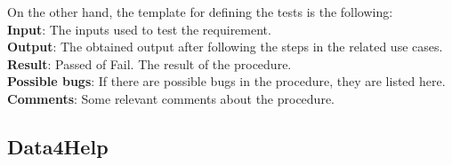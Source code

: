 \documentclass[a4paper, hidelinks, 12pt]{report}
\begin{document}
	On the other hand, the template for defining the tests is the following:\\
	\textbf{Input}: The inputs used to test the requirement.\\
	\textbf{Output}: The obtained output after following the steps in the related use cases.\\
	\textbf{Result}: Passed of Fail. The result of the procedure.\\
	\textbf{Possible bugs}: If there are possible bugs in the procedure, they are listed here.\\
	\textbf{Comments}: Some relevant comments about the procedure.

	\subsection{Data4Help}
\end{document}
